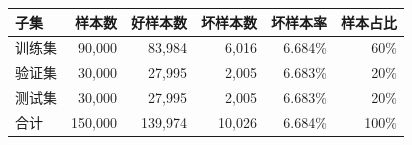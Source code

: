 \begin{tabular}{lrrrrr}
\toprule
子集 & 样本数 & 好样本数 & 坏样本数 & 坏样本率 & 样本占比 \\
\midrule
训练集 & 90,000 & 83,984 & 6,016 & 6.684\% & 60\% \\
验证集 & 30,000 & 27,995 & 2,005 & 6.683\% & 20\% \\
测试集 & 30,000 & 27,995 & 2,005 & 6.683\% & 20\% \\
\midrule
合计 & 150,000 & 139,974 & 10,026 & 6.684\% & 100\% \\
\bottomrule
\end{tabular}
